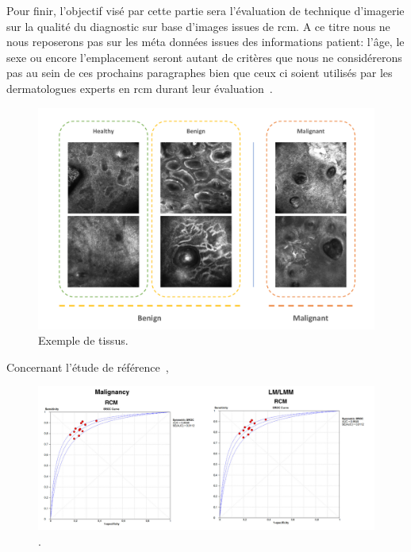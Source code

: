 Pour finir, l'objectif visé par cette partie sera l'évaluation de technique d'imagerie sur la qualité du diagnostic sur base d'images issues de \gls{rcm}. A ce titre nous ne nous reposerons pas sur les méta données issues des informations patient: l'âge, le sexe ou encore l'emplacement seront autant de critères que nous ne considérerons pas au sein de ces prochains paragraphes bien que ceux ci soient utilisés par les dermatologues experts en \gls{rcm} durant leur évaluation~\cite{Cinotti2018}.\par

\begin{figure}[H]
    \begin{center}
        \includegraphics[width=\linewidth]{contents/x_microscopy/resources/example_rcm_data.pdf}
        \caption{Exemple de tissus.}
        \label{fig:example_rcm_data}
    \end{center} 
\end{figure}\par


Concernant l'étude de référence~\cite{Cinotti2018}, 
\begin{figure}[H]
    \begin{center}
        \includegraphics[width=\linewidth]{contents/x_microscopy/resources/results_rcm_experts.png}
        \caption{.}
        \label{fig:results_rcm_experts}
    \end{center} 
\end{figure}\par


